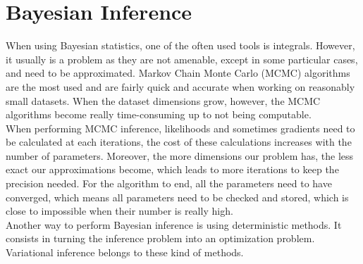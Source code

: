 \documentclass{article}
\begin{document}
\section{Bayesian Inference}
When using Bayesian statistics, one of the often used tools is integrals. However, it usually is a problem as they are not amenable, except in some particular cases, and need to be approximated. Markov Chain Monte Carlo (MCMC) algorithms are the most used and are fairly quick and accurate when working on reasonably small datasets. When the dataset dimensions grow, however, the MCMC algorithms become really time-consuming up to not being computable.\\
\newline
%
When performing MCMC inference, likelihoods and sometimes gradients need to be calculated at each iterations, the cost of these calculations increases with the number of parameters. Moreover, the more dimensions our problem has, the less exact our approximations become, which leads to more iterations to keep the precision needed. For the algorithm to end, all the parameters need to have converged, which means all parameters need to be checked and stored, which is close to impossible when their number is really high.\\
\newline
Another way to perform Bayesian inference is using deterministic methods. It consists in turning the inference problem into an optimization problem. Variational inference belongs to these kind of methods.
\end{document}
